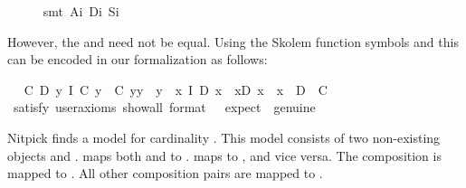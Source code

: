 \begin{isabellebody}
%
\isadelimproof
\ \ \ \ %
\endisadelimproof
%
\isatagproof
{}\isamarkupfalse%
\ {\isacharparenleft}smt\ A\isactrlsub i\ D\isactrlsub i\ S\isactrlsub i{\isacharparenright}%
\endisatagproof
{\isafoldproof}%
%
\isadelimproof
%
\endisadelimproof
%
\begin{isamarkuptext}%
However, the  and  need not be equal. Using the Skolem 
   function symbols  and  this can be encoded in
   our formalization as follows:%
\end{isamarkuptext}\isamarkuptrue%
\ \isamarkupfalse%
\ {\isachardoublequoteopen}{\isacharparenleft}{\isasymexists}C\ D{\isachardot}\ {\isacharparenleft}\isactrlbold {\isasymforall}y{\isachardot}\ I\ {\isacharparenleft}C\ y{\isacharparenright}\ \isactrlbold {\isasymand}\ {\isacharparenleft}C\ y{\isacharparenright}{\isasymcdot}y\ {\isasymcong}\ y{\isacharparenright}\ \isactrlbold {\isasymand}\ {\isacharparenleft}\isactrlbold {\isasymforall}x{\isachardot}\ I\ {\isacharparenleft}D\ x{\isacharparenright}\ \isactrlbold {\isasymand}\ x{\isasymcdot}{\isacharparenleft}D\ x{\isacharparenright}\ {\isasymcong}\ x{\isacharparenright}\ \isactrlbold {\isasymand}\ \isactrlbold {\isasymnot}{\isacharparenleft}D\ {\isacharequal}\ C{\isacharparenright}{\isacharparenright}{\isachardoublequoteclose}\isanewline
\ \ \ \isamarkupfalse%
\ {\isacharbrackleft}satisfy{\isacharcomma}\ user{\isacharunderscore}axioms{\isacharcomma}\ show{\isacharunderscore}all{\isacharcomma}\ format\ {\isacharequal}\ {}{\isacharcomma}\ expect\ {\isacharequal}\ genuine{\isacharbrackright}%
\isadelimproof
\ %
\endisadelimproof
%
\isatagproof
{}\isamarkupfalse%
\ \ %
%
\endisatagproof
{\isafoldproof}%
%
\isadelimproof
%
\endisadelimproof
%
\begin{isamarkuptext}%
Nitpick finds a model for cardinality . This model consists of two non-existing
   objects  and .  maps both  and  to
   .  maps  to , and vice versa. The composition 
   is mapped to . All other composition pairs are mapped to .%
\end{isamarkuptext}\isamarkuptrue%

\end{isabellebody}
